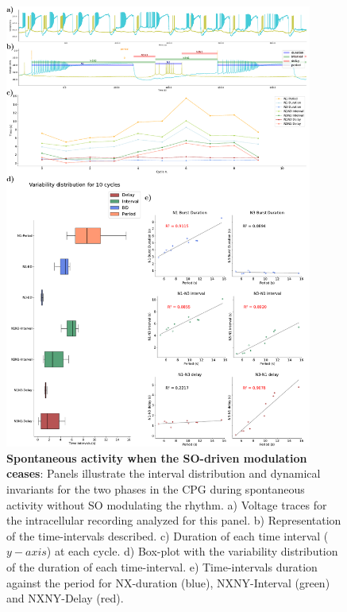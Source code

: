\begin{figure}[htbp]
	\centering
	\includegraphics[width=0.9\textwidth]{./img/invariants/data/SUSSEX/prep4_so_no_driven/images/panel_with_intervals.pdf}
	\caption{\textbf{Spontaneous activity when the SO-driven modulation ceases}: Panels illustrate the interval distribution and dynamical invariants for the two phases in the CPG during spontaneous activity without SO modulating the rhythm. a) Voltage traces for the intracellular recording analyzed for this panel. b) Representation of the time-intervals described. c) Duration of each time interval ($y-axis$) at each cycle. d) Box-plot with the variability distribution of the duration of each time-interval. e) Time-intervals duration against the period for NX-duration (blue), NXNY-Interval (green) and NXNY-Delay (red).}
	\label{fig:no so spontaneous invariants}
\end{figure}
 


